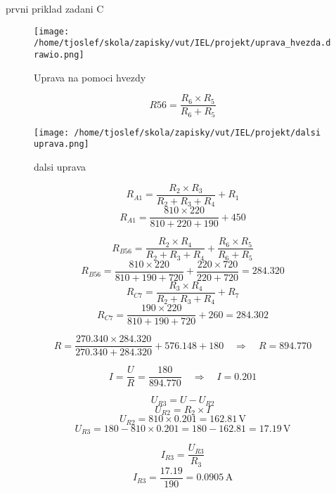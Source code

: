 \documentclass{article}
\begin{document}
\sloppy
prvni priklad zadani C

\begin{figure}[h!]
  \centering
  \texttt{[image: /home/tjoslef/skola/zapisky/vut/IEL/projekt/uprava\_hvezda.drawio.png]}
  \caption{Uprava na pomoci hvezdy}
  \label{fig:hvezda}
\end{figure}

\[
    R56 = \frac{R_6 \times R_5}{R_6+ R_5}
\]

\begin{figure}[h!]
  \centering
\texttt{[image: /home/tjoslef/skola/zapisky/vut/IEL/projekt/dalsi uprava.png]}
  \caption{dalsi uprava}
  \label{fig:dalsi_uprava}
\end{figure}

\[
R_{A1} = \frac{R_2 \times R_3}{R_2 + R_3 + R_4} + R_1
\]
\[
R_{A1} = \frac{810 \times 220}{810 + 220 + 190} + 450
\]

\[
R_{B56} = \frac{R_2 \times R_4}{R_2 + R_3 + R_4} +\frac{R_6 \times R_5}{R_6+ R_5}
\]
\[
R_{B56} = \frac{810 \times 220}{810 + 190 + 720} + \frac{220 \times 720}{220+ 720}
= 284.320
\]
\[
R_{C7} = \frac{R_3 \times R_4}{R_2 + R_3 + R_4} + R_7
\]
\[
R_{C7} = \frac{190 \times 220}{810 + 190 + 720} + 260 = 284.302
\]

\[
R = \frac{270.340 \times 284.320}{270.340+284.320}  + 576.148 + 180 \quad \Rightarrow \quad R = 894.770
\]

\[
I = \frac{U}{R} = \frac{180}{894.770} \quad \Rightarrow \quad I = 0.201
\]

\[
U_{R3} = U - U_{R2}
\]
\[
U_{R2} = R_2 \times I
\]
\[
U_{R2} = 810 \times 0.201 = 162.81 \, \text{V}
\]
\[
U_{R3} = 180 - 810 \times 0.201 = 180 - 162.81 = 17.19 \, \text{V}
\]

\[
I_{R3} = \frac{U_{R3}}{R_3}
\]
\[
I_{R3} = \frac{17.19}{190} = 0.0905 \, \text{A}
\]
\end{document}
